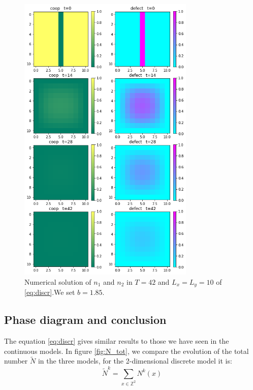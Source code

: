 \begin{figure}
\includegraphics[width=0.75\textwidth]{immagini/discr-delta}

\caption{\label{fig:delta-1}Numerical solution of $n_{1}$ and $n_{2}$ in
$T=42$ and $L_{x}=L_{y}=10$ of \ref{eq:discr}.We set $b=1.85$.}
\end{figure}


\subsection{Phase diagram and conclusion}

The equation \ref{eq:discr} gives similar results to those we have
seen in the continuous models. In figure \ref{fig:N_tot}, we compare
the evolution of the total number $\tilde{N}$ in the three models,
for the 2-dimensional discrete model it is:
\[
\tilde{N}^{k}=\sum_{x\in\mathbb{Z}^{2}}N^{k}\left(x\right)
\]

